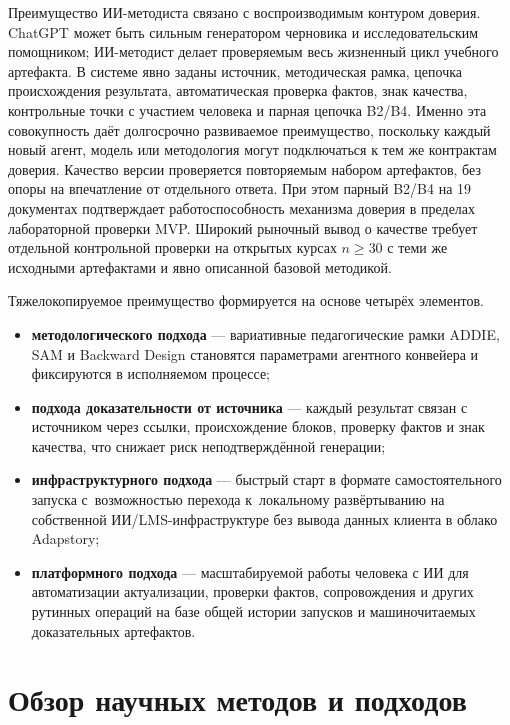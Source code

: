 Преимущество ИИ-методиста связано с воспроизводимым контуром доверия.
ChatGPT может быть сильным генератором черновика и исследовательским
помощником; ИИ-методист делает проверяемым весь жизненный цикл учебного
артефакта.
В системе явно заданы источник, методическая рамка, цепочка происхождения
результата, автоматическая проверка фактов, знак качества, контрольные
точки с участием человека и парная цепочка B2/B4. Именно эта совокупность
даёт долгосрочно развиваемое преимущество, поскольку каждый новый агент,
модель или методология могут подключаться к тем же
контрактам доверия. Качество версии проверяется повторяемым набором
артефактов, без опоры на впечатление от отдельного ответа.
При этом парный B2/B4 на 19 документах подтверждает работоспособность
механизма доверия в пределах лабораторной проверки MVP. Широкий рыночный
вывод о качестве требует отдельной контрольной проверки на открытых курсах
$n \geq 30$ с теми же исходными артефактами и явно описанной базовой методикой.

Тяжелокопируемое преимущество формируется на основе четырёх элементов.

\begin{itemize}
  \item \textbf{методологического подхода} — вариативные педагогические
    рамки ADDIE, SAM и Backward Design становятся параметрами
    агентного конвейера и фиксируются в исполняемом процессе;
  \item \textbf{подхода доказательности от источника} — каждый результат связан
    с источником через ссылки, происхождение блоков, проверку фактов и
    знак качества, что снижает риск неподтверждённой генерации;
  \item \textbf{инфраструктурного подхода} — быстрый старт в формате
    самостоятельного запуска с~возможностью перехода к~локальному
    развёртыванию на собственной ИИ/LMS-инфраструктуре без вывода данных
    клиента в облако Adapstory;
  \item \textbf{платформного подхода} — масштабируемой работы человека с ИИ для автоматизации актуализации, проверки фактов, сопровождения
   и других рутинных операций на базе общей истории запусков и
   машиночитаемых доказательных артефактов.
\end{itemize}

\section{Обзор научных методов и подходов}

